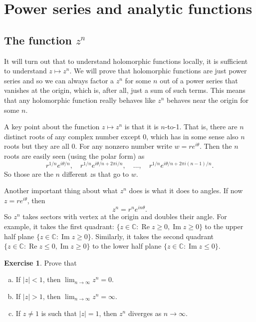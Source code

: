 \documentclass[12pt,openany]{book}
\renewcommand{\Re}{\operatorname{Re}}
\renewcommand{\Im}{\operatorname{Im}}
\newcommand{\sabs}[1]{\lvert {#1} \rvert}
\newcommand{\C}{{\mathbb{C}}}
\theoremstyle{plain}
\theoremstyle{remark}
\theoremstyle{definition}
\newenvironment{exbox}{%
    \def\FrameCommand{\vrule width 1pt \relax\hspace {10pt}}%
    \MakeFramed {\advance \hsize -\width \FrameRestore }%
}{%
    \endMakeFramed
}
\newenvironment{exparts}{%
    \leavevmode\begin{enumerate}[a),noitemsep,topsep=0pt,parsep=0pt,partopsep=0pt]
}{%
    \end{enumerate}
}
\theoremstyle{exercise}
\newtheorem{exercise}{Exercise}[section]
\theoremstyle{example}
\begin{document}

\section{Power series and analytic functions}
\label{sec:analfuncs}

\subsection{The function $z^n$}

It will turn out that to understand holomorphic functions locally, 
it is sufficient to understand $z \mapsto z^n$.  We will prove that
holomorphic functions are just power series and so we can always factor
a $z^n$ for some $n$ out of a power series that vanishes at the origin, which is,
after all, just a sum of such terms.  This means that any holomorphic
function really behaves like $z^n$ behaves near the origin for some $n$.

A key point about the function $z \mapsto z^n$ is that it is $n$-to-1.
That is, there are $n$ distinct roots of any complex number except 0,
which has in some sense also $n$ roots but they are all 0.  For any nonzero
number write $w = re^{i\theta}$.  Then the $n$ roots are easily seen
(using the polar form) as
\begin{equation*}
r^{1/n} e^{i\theta/n}
, \quad
r^{1/n} e^{i\theta/n + 2\pi i /n}
, \quad \ldots, \quad
r^{1/n} e^{i\theta/n + 2\pi i (n-1)/n} .
\end{equation*}
So those are the $n$ different $z$s that go to $w$.

Another important thing about what $z^n$ does is what it does to angles.
If now $z = re^{i\theta}$, then
\begin{equation*}
z^n = r^n e^{i n\theta} .
\end{equation*}
So $z^n$ takes sectors with vertex at the origin and doubles their angle.
For example, it takes the first quadrant:
$\{ z \in \C : \Re z \geq 0, \Im z \geq 0 \}$
to the upper half plane $\{ z \in \C : \Im z \geq 0 \}$.
Similarly, it takes the second quadrant
$\{ z \in \C : \Re z \leq 0, \Im z \geq 0 \}$
to the lower half plane $\{ z \in \C : \Im z \leq 0 \}$.

\begin{exbox}
\begin{exercise}
Prove that
\begin{exparts}
\item
If $\sabs{z}<1$, then $\lim_{n\to \infty} z^n = 0$.
\item
If $\sabs{z}>1$, then $\lim_{n\to \infty} z^n = \infty$.
\item
If $z \not= 1$ is such that $\sabs{z}=1$, then $z^n$ diverges as $n \to
\infty$.
\end{exparts}
\end{exercise}
\end{exbox}
\end{document}
